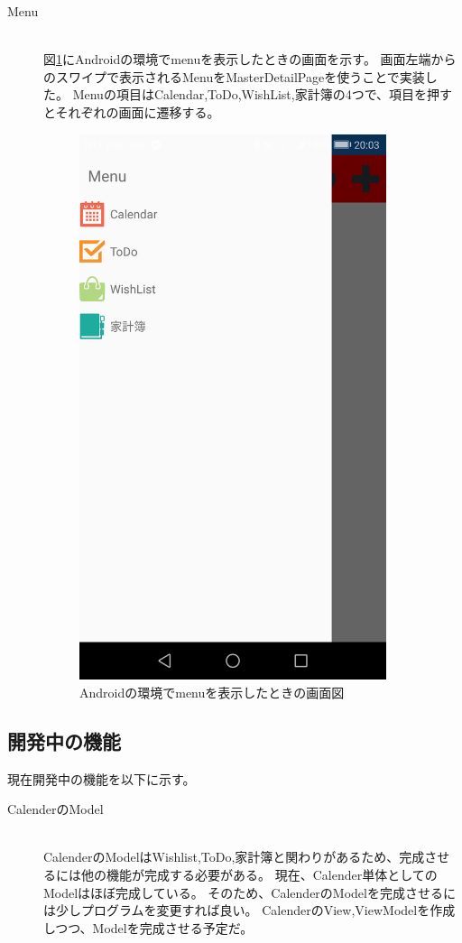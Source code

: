 ﻿\documentclass[a4j]{jarticle}
\begin{document}
\begin{description}
	\item[Menu] \mbox{} \\
		図\ref{MenuFig1}にAndroidの環境でmenuを表示したときの画面を示す。
		画面左端からのスワイプで表示されるMenuをMasterDetailPageを使うことで実装した。
		Menuの項目はCalendar,ToDo,WishList,家計簿の4つで、項目を押すとそれぞれの画面に遷移する。
		\begin{figure}[htbp]
			\centering
			\includegraphics[width=90mm]{figures/MenuPage.png}
			\caption{Androidの環境でmenuを表示したときの画面図}
			\label{MenuFig1}
		\end{figure}
\end{description}
\clearpage

\subsection{開発中の機能}
現在開発中の機能を以下に示す。
\begin{description}
	\item[CalenderのModel] \mbox{} \\
		CalenderのModelはWishlist,ToDo,家計簿と関わりがあるため、完成させるには他の機能が完成する必要がある。
		現在、Calender単体としてのModelはほぼ完成している。
		そのため、CalenderのModelを完成させるには少しプログラムを変更すれば良い。
		CalenderのView,ViewModelを作成しつつ、Modelを完成させる予定だ。
\end{description}
\end{document}
